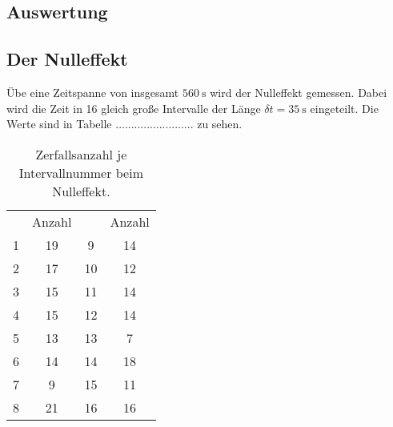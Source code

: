 \subsection{Auswertung}

\subsection{Der Nulleffekt}
Übe eine Zeitspanne von insgesamt $\qty[]{560}{\second}$ wird der Nulleffekt gemessen.
Dabei wird die Zeit in 16 gleich große Intervalle der Länge $\delta t = \qty[]{35}{\second}$ eingeteilt. 
Die Werte sind in Tabelle ......................... zu sehen.

\begin{table}
    \centering
    \begin{tabular}{S S S S}
        \toprule
        {} & {Anzahl} & {} & {Anzahl} \\
        \cmidrule(lr){1-2}\cmidrule(lr){3-4}
        1 & 19 &  9 & 14 \\
        2 & 17 & 10 & 12 \\
        3 & 15 & 11 & 14 \\
        4 & 15 & 12 & 14 \\
        5 & 13 & 13 &  7 \\
        6 & 14 & 14 & 18 \\
        7 &  9 & 15 & 11 \\
        8 & 21 & 16 & 16 \\
    \end{tabular}
    \caption[short]{Zerfallsanzahl je Intervallnummer beim Nulleffekt.}
    \label{tab:nulleffekt}
\end{table}
